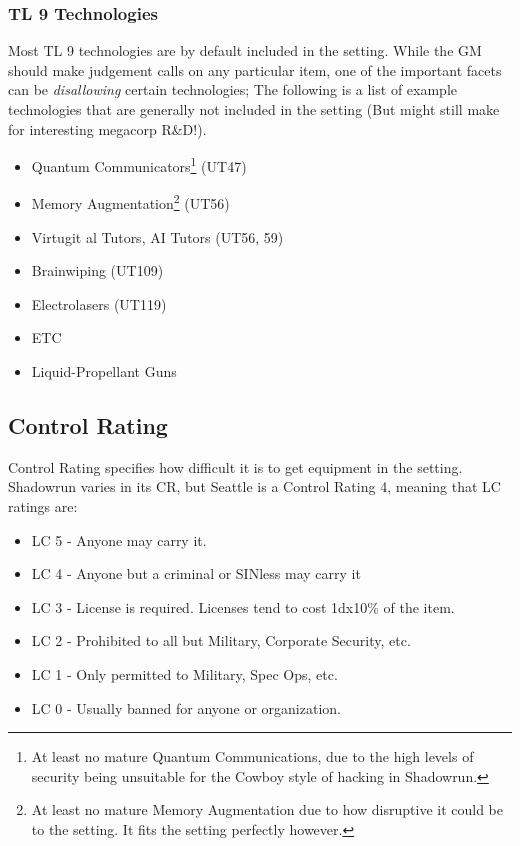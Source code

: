 \begin{multicols*}{3}
	\subsubsection{TL 9 Technologies}
	
	Most TL 9 technologies are by default included in the setting. While the GM should make judgement calls on any particular item, one of the important facets can be \textit{disallowing} certain technologies; The following is a list of example technologies that are generally not included in the setting (But might still make for interesting megacorp R\&D!).
	
	\begin{itemize}
		\itemsep 0pt
		\item Quantum Communicators\footnote{At least no mature Quantum Communications, due to the high levels of security being unsuitable for the Cowboy style of hacking in Shadowrun.} (UT47)
		\item Memory Augmentation\footnote{At least no mature Memory Augmentation due to how disruptive it could be to the setting. It fits the setting perfectly however.} (UT56)
		\item Virtugit al Tutors, AI Tutors (UT56, 59)
		\item Brainwiping (UT109)
		\item Electrolasers (UT119)
		\item ETC
		\item Liquid-Propellant Guns
	\end{itemize}
	
	\subsection{Control Rating}
	
	Control Rating specifies how difficult it is to get equipment in the setting. Shadowrun varies in its CR, but Seattle is a Control Rating 4, meaning that LC ratings are:
	
	\begin{itemize}
		\itemsep 0pt
		\item LC 5 - Anyone may carry it.
		\item LC 4 - Anyone but a criminal or SINless may carry it
		\item LC 3 - License is required. Licenses tend to cost 1dx10\% of the item.
		\item LC 2 - Prohibited to all but Military, Corporate Security, etc.
		\item LC 1 - Only permitted to Military, Spec Ops, etc.
		\item LC 0 - Usually banned for anyone or organization.
	\end{itemize}
	

\end{multicols*}
